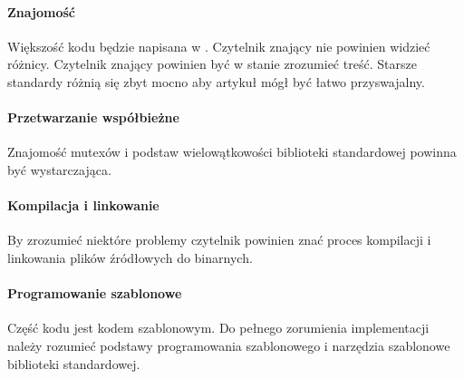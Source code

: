 \paragraph{Znajomość }
Większość kodu będzie napisana w . Czytelnik znający  nie powinien widzieć różnicy. Czytelnik znający  powinien być w stanie zrozumieć treść. Starsze standardy różnią się zbyt mocno aby artykuł mógł być łatwo przyswajalny.

\paragraph{Przetwarzanie współbieżne}
Znajomość mutexów i podstaw wielowątkowości biblioteki standardowej \Cpp{} powinna być wystarczająca.

\paragraph{Kompilacja i linkowanie}
By zrozumieć niektóre problemy czytelnik powinien znać proces kompilacji i linkowania plików źródłowych do binarnych.

\paragraph{Programowanie szablonowe}
Część kodu jest kodem szablonowym. Do pełnego zorumienia implementacji należy rozumieć podstawy programowania szablonowego i narzędzia szablonowe biblioteki standardowej.
